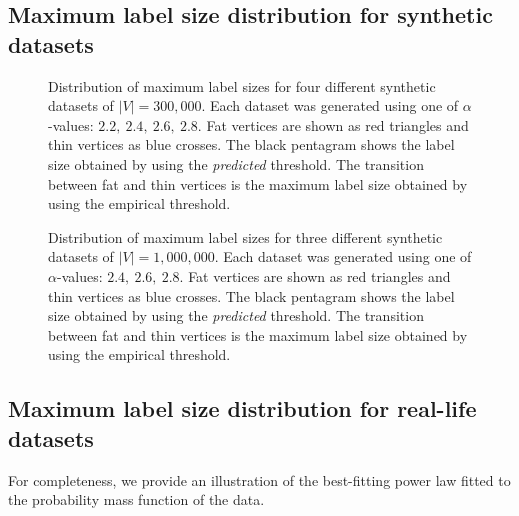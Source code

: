 \documentclass{article}
\theoremstyle{remark}
\begin{document}
\subsection{Maximum label size distribution for synthetic datasets}\label{App:ExpRes:MaxLabelSyn}
\begin{figure}[!ht]
\centering
{}
\quad
{}
\caption{Distribution of maximum label sizes for four different synthetic datasets of $\vert V\vert = 300,000$. Each dataset was generated using one of $\alpha$-values: $2.2,~2.4,~2.6,~2.8$. Fat vertices are shown as red triangles and thin vertices as blue crosses. The black pentagram shows the label size obtained by using the \emph{predicted} threshold. The transition between fat and thin vertices is the maximum label size obtained by using the empirical threshold.}\label{fig:synthetic300}\end{figure}


\begin{figure}[!ht]
\centering
{}
\quad
{}\caption{Distribution of maximum label sizes for three different synthetic datasets of $\vert V\vert = 1,000,000$. Each dataset was generated using one of $\alpha$-values: $2.4,~2.6,~2.8$. Fat vertices are shown as red triangles and thin vertices as blue crosses. The black pentagram shows the label size obtained by using the \emph{predicted} threshold. The transition between fat and thin vertices is the maximum label size obtained by using the empirical threshold.}\label{fig:synthetic1M}\end{figure}
\clearpage

\subsection{Maximum label size distribution for real-life datasets}\label{App:ExpRes:MaxLabelEmp}
For completeness,  we  provide an illustration of the best-fitting power law fitted to the probability mass function of the data.
\end{document}
